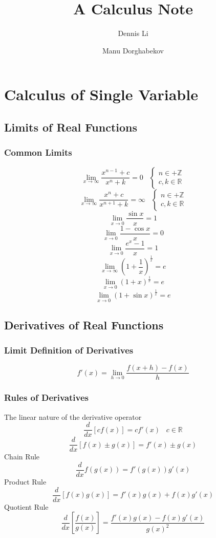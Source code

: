 \documentclass[12pt]{book}
\title{A Calculus Note}
\author{Dennis Li \and Manu Dorghabekov}
\date{}
\newcommand{\liminfty}[1]{\lim_{#1 \to \infty}}
\newcommand{\limzero}[1]{\lim_{#1 \to 0}}
\newcommand{\R}{\mathbb{R}}
\newcommand{\dydx}[2]{\frac{d #1}{d #2}}
\newcommand{\sqbkt}[1]{\left[ #1 \right]}
\begin{document}
\maketitle
\tableofcontents

\chapter{Calculus of Single Variable}

\section{Limits of Real Functions}

\subsection{Common Limits}

\[
\liminfty{x} \frac{x^{n-1} +c}{x^n + k} = 0 \;\;\;
\begin{cases}
    n \in + \mathbb{Z} \\
    c,k \in \mathbb{R}
\end{cases}
\]
\[
\liminfty{x} \frac{x^n +c}{x^{n+1}+k} = \infty \;\;\; 
\begin{cases}
    n \in + \mathbb{Z} \\
    c,k \in \mathbb{R}
\end{cases}
\]
\[
\limzero{x} \frac{\sin x}{x} = 1
\]
\[
\limzero{x} \frac{1 - \cos x}{x} =0
\]
\[
\limzero{x} \frac{e^x-1}{x} = 1
\]
\[
\liminfty{x} \left( 1 + \frac{1}{x}\right)^{\frac{1}{x}} = e
\]
\[
\limzero{x} (1+x)^{\frac{1}{x}} = e
\]
\[
\limzero{x} (1+\sin x)^{\frac{1}{x}} = e
\]

\section{Derivatives of Real Functions}
\subsection{Limit Definition of Derivatives}
\[
f'(x) = \limzero{h} \frac{f(x+h) - f(x)}{h}
\]
\subsection{Rules of Derivatives}
The linear nature of the derivative operator
\[
\dydx{}{x} \sqbkt{cf(x)} = cf'(x) \;\;\; c\in \R
\]
\[
\dydx{}{x} \sqbkt{f(x) \pm g(x)} = f'(x) \pm g(x) 
\]
Chain Rule
\[
\dydx{}{x}f\left( g(x) \right) = f'\left( g(x) \right)g'(x)
\]
Product Rule
\[
\dydx{}{x} \left[  f(x)g(x)  \right] = f'(x)g(x) + f(x)g'(x)
\]
Quotient Rule
\[
\dydx{}{x} \left[ \frac{f(x)}{g(x)} \right] = \frac{f'(x)g(x) - f(x)g'(x)}{g(x)^2}
\]
\end{document}
